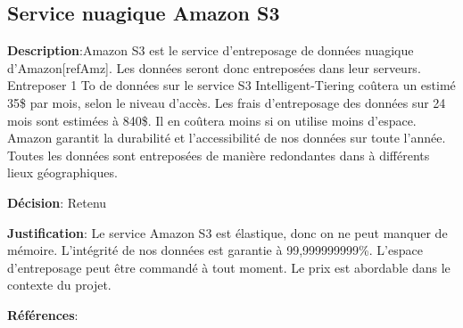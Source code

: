 

\subsection{Service nuagique Amazon S3}
\label{s:archiver_conc2}

\textbf{Description}:Amazon S3 est le service d'entreposage de données nuagique d’Amazon[refAmz]. Les données seront donc entreposées dans leur serveurs. Entreposer 1 To de données sur le service S3 Intelligent-Tiering coûtera un estimé 35\$ par mois, selon le niveau d’accès.  Les frais d’entreposage des données sur 24 mois sont estimées à 840\$. Il en coûtera moins si on utilise moins d’espace. Amazon garantit la durabilité et l'accessibilité de nos données sur toute l’année. Toutes les données sont entreposées de manière redondantes dans à différents lieux géographiques.

\textbf{Décision}: Retenu

\textbf{Justification}:  Le service Amazon S3 est élastique, donc on ne peut manquer de mémoire. L’intégrité de nos données est garantie à 99,999999999\%. L’espace d’entreposage peut être commandé à tout moment. Le prix est abordable dans le contexte du projet.

\textbf{Références}: 
\cite{amznS3, amznProt}
